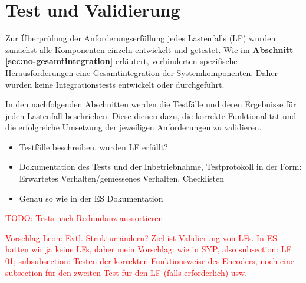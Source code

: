 \newpage
\section{Test und Validierung}
\label{sec:test-validation}
Zur Überprüfung der Anforderungserfüllung jedes Lastenfalls (LF) wurden zunächst alle Komponenten einzeln entwickelt und getestet. Wie im \textbf{Abschnitt \ref{sec:no-gesamtintegration}} erläutert, verhinderten spezifische Herausforderungen eine Gesamtintegration der Systemkomponenten. Daher wurden keine Integrationstests entwickelt oder durchgeführt.

In den nachfolgenden Abschnitten werden die Testfälle und deren Ergebnisse für jeden Lastenfall beschrieben. Diese dienen dazu, die korrekte Funktionalität und die erfolgreiche Umsetzung der jeweiligen Anforderungen zu validieren.


\begin{itemize}
    \item Testfälle beschreiben, wurden LF erfüllt?
    \item Dokumentation des Tests und der Inbetriebnahme, Testprotokoll in der Form: Erwartetes Verhalten/gemessenes Verhalten, Checklisten
    \item Genau so wie in der ES Dokumentation
\end{itemize}

\textcolor{red}{TODO: Tests nach Redundanz aussortieren}

\textcolor{red}{Vorschlag Leon: Evtl. Struktur ändern? Ziel ist Validierung von LFs. In ES hatten wir ja keine LFs, daher mein Vorschlag: wie in SYP, also subsection: LF 01; subsubsection: Testen der korrekten Funktionsweise des Encoders, noch eine subsection für den zweiten Test für den LF (falls erforderlich) usw.}






